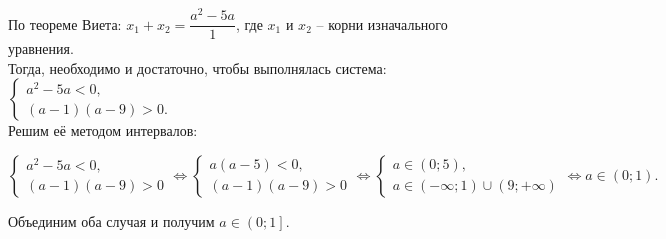 По теореме Виета: $x_1+x_2=\dfrac{a^2-5a}{1}$, где $x_1$ и  $x_2$ -- корни изначального уравнения.\\
Тогда, необходимо и достаточно, чтобы выполнялась система: $\left\{
\begin{array}{l}
a^2-5a<0,\\
(a-1)(a-9)>0.
\end{array} \right.$\\
Решим её методом интервалов:\\
\begin{center}$
\left\{ \begin{array}{l}
a^2-5a<0,\\
(a-1)(a-9)>0
\end{array} \right. \Leftrightarrow
\left\{ \begin{array}{l}
a(a-5)<0,\\
(a-1)(a-9)>0
\end{array} \right. \Leftrightarrow
\left\{ \begin{array}{l}
a\in(0;5),\\
a\in(-\infty;1)\cup(9;+\infty)
\end{array} \right. \Leftrightarrow a\in\left(0;1\right).
$\end{center}
Объединим оба случая и получим $a\in\left(0;1 \right]$.\\
\Answer{$a\in\left(0;1 \right]$}
